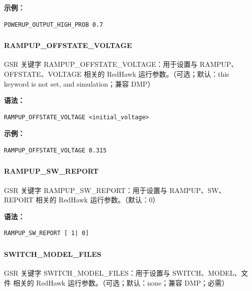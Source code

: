 \textbf{示例：}
\begin{lstlisting}
POWERUP_OUTPUT_HIGH_PROB 0.7
\end{lstlisting}

\subsubsection{}
\paragraph*{RAMPUP_OFFSTATE_VOLTAGE}

GSR 关键字 RAMPUP_OFFSTATE_VOLTAGE：用于设置与 RAMPUP、OFFSTATE、VOLTAGE 相关的 RedHawk 运行参数。（可选；默认：this keyword is not set, and simulation；兼容 DMP）

\textbf{语法：}
\begin{lstlisting}
RAMPUP_OFFSTATE_VOLTAGE <initial_voltage>
\end{lstlisting}

\textbf{示例：}
\begin{lstlisting}
RAMPUP_OFFSTATE_VOLTAGE 0.315
\end{lstlisting}

\subsubsection{}
\paragraph*{RAMPUP_SW_REPORT}

GSR 关键字 RAMPUP_SW_REPORT：用于设置与 RAMPUP、SW、REPORT 相关的 RedHawk 运行参数。（默认：0）

\textbf{语法：}
\begin{lstlisting}
RAMPUP_SW_REPORT [ 1| 0]
\end{lstlisting}

\subsubsection{}
\paragraph*{SWITCH_MODEL_FILES}

GSR 关键字 SWITCH_MODEL_FILES：用于设置与 SWITCH、MODEL、文件 相关的 RedHawk 运行参数。（可选；默认：none；兼容 DMP；必需）


